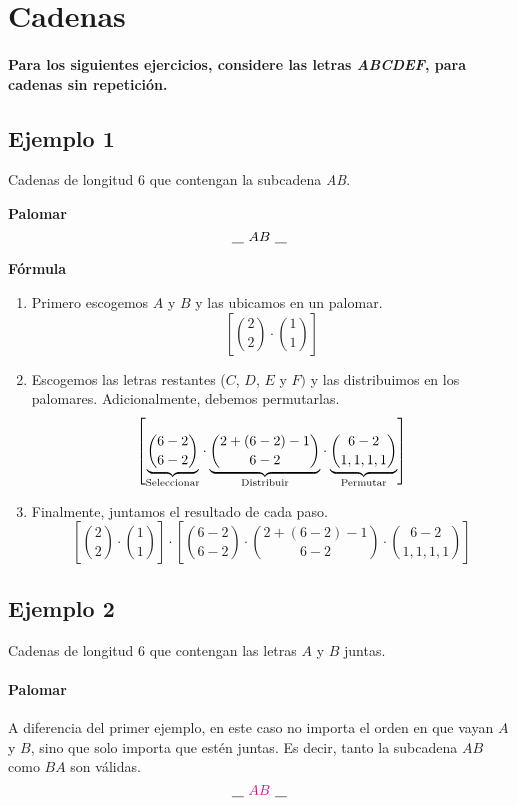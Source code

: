 \section{Cadenas}

\paragraph{Para los siguientes ejercicios, considere las letras \textit{ABCDEF}, para cadenas sin repetición.}

\subsection{Ejemplo 1}

Cadenas de longitud 6 que contengan la subcadena \textit{AB}.

\textbf{Palomar}
\begin{equation*}
	~\underline{\hspace{0.3cm}}~ AB ~\underline{\hspace{0.3cm}}~
\end{equation*}

\textbf{Fórmula}

\begin{enumerate}
\item Primero escogemos $A$ y $B$ y las ubicamos en un palomar.
$$\left[\binom{2}{2}\cdot\binom{1}{1}\right]$$
\item Escogemos las letras restantes ($C$, $D$, $E$ y $F)$ y las distribuimos en los palomares. Adicionalmente, debemos permutarlas.
\begin{align*}
	\left[\underset{\text{Seleccionar}}{\underbrace{\binom{6-2}{6-2}}}\cdot\underset{\text{Distribuir}}{\underbrace{\binom{2+(6-2)-1}{6-2}}}\cdot\underset{\text{Permutar}}{\underbrace{\binom{6-2}{1,1,1,1}}}\right]
\end{align*}
\item Finalmente, juntamos el resultado de cada paso.
\begin{equation*}
\left[\binom{2}{2}\cdot\binom{1}{1}\right]
\cdot
\left[\binom{6-2}{6-2}\cdot\binom{2+(6-2)-1}{6-2}\cdot\binom{6-2}{1,1,1,1}\right]
\end{equation*}
\end{enumerate}

\subsection{Ejemplo 2}
Cadenas de longitud 6 que contengan las letras $A$ y $B$ juntas.

\paragraph{Palomar}
A diferencia del primer ejemplo, en este caso no importa el orden en que vayan $A$ y $B$, sino que solo importa que estén juntas. Es decir, tanto la subcadena $AB$ como $BA$ son válidas.
\begin{equation*}
~\underline{\hspace{0.3cm}}~ {\color{magenta} AB} ~\underline{\hspace{0.3cm}}~
\end{equation*}

